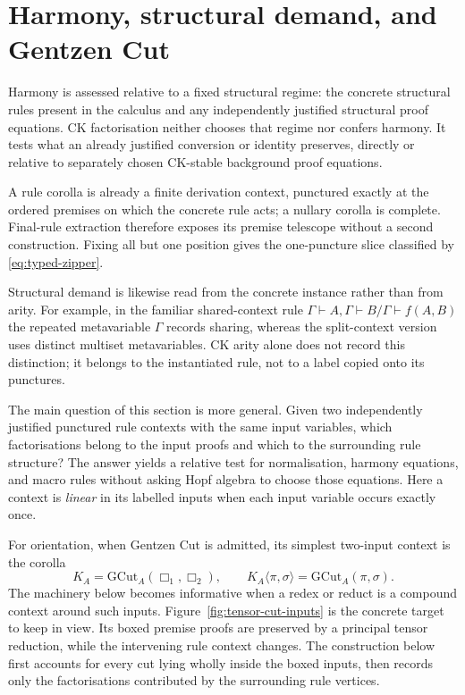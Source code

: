 \documentclass[10pt,a4paper]{article}
\theoremstyle{plain}
\theoremstyle{definition}
\theoremstyle{remark}
\newcommand{\ms}{\mathrel{\vdash}}
\begin{document}
\section{Harmony, structural demand, and Gentzen Cut}
\label{sec:harmony}

Harmony is assessed relative to a fixed structural regime: the concrete
structural rules present in the calculus and any independently justified
structural proof equations.  CK factorisation neither chooses that regime
nor confers harmony.  It tests what an already justified conversion or
identity preserves, directly or relative to separately chosen CK-stable
background proof equations.

A rule corolla is already a finite derivation context, punctured exactly at
the ordered premises on which the concrete rule acts; a nullary corolla is
complete.
Final-rule extraction therefore exposes its premise telescope without a
second construction.  Fixing all but one position gives the one-puncture slice classified
by \eqref{eq:typed-zipper}.

Structural demand is likewise read from the concrete instance rather than
from arity.  For
example, in the familiar shared-context rule
\(
\Gamma\ms A,\Gamma\ms B/\Gamma\ms f(A,B)
\)
the repeated metavariable \(\Gamma\) records sharing, whereas the
split-context version uses distinct multiset metavariables.  CK arity alone
does not record this distinction; it belongs to the instantiated rule, not
to a label copied onto its punctures.

The main question of this section is more general.  Given two independently
justified punctured rule contexts with the same input variables, which
factorisations belong to the input proofs and which to the surrounding rule
structure?
The answer yields a relative test for normalisation, harmony equations, and
macro rules without asking Hopf algebra to choose those equations.
Here a context is \emph{linear} in its labelled inputs when each input
variable occurs exactly once.

For orientation, when Gentzen Cut is admitted, its simplest two-input
context is the corolla
\[
 K_A=\mathrm{GCut}_A(\Box_1,\Box_2),\qquad
 K_A\langle\pi,\sigma\rangle=\mathrm{GCut}_A(\pi,\sigma).
\]
The machinery below becomes informative when a redex or reduct is a
compound context around such inputs.
Figure~\ref{fig:tensor-cut-inputs} is the concrete target to keep in view.
Its boxed premise proofs are preserved by a principal tensor reduction,
while the intervening rule context changes.  The construction below first
accounts for every cut lying wholly inside the boxed inputs, then records
only the factorisations contributed by the surrounding rule vertices.
\end{document}
